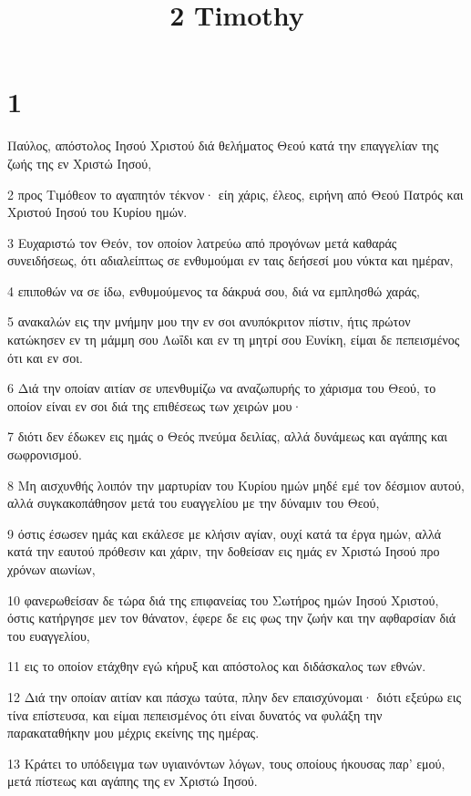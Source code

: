 

\title{2 Timothy}


\chapter{1}

\par Παύλος, απόστολος Ιησού Χριστού διά θελήματος Θεού κατά την επαγγελίαν της ζωής της εν Χριστώ Ιησού,
\par 2 προς Τιμόθεον το αγαπητόν τέκνον· είη χάρις, έλεος, ειρήνη από Θεού Πατρός και Χριστού Ιησού του Κυρίου ημών.
\par 3 Ευχαριστώ τον Θεόν, τον οποίον λατρεύω από προγόνων μετά καθαράς συνειδήσεως, ότι αδιαλείπτως σε ενθυμούμαι εν ταις δεήσεσί μου νύκτα και ημέραν,
\par 4 επιποθών να σε ίδω, ενθυμούμενος τα δάκρυά σου, διά να εμπλησθώ χαράς,
\par 5 ανακαλών εις την μνήμην μου την εν σοι ανυπόκριτον πίστιν, ήτις πρώτον κατώκησεν εν τη μάμμη σου Λωΐδι και εν τη μητρί σου Ευνίκη, είμαι δε πεπεισμένος ότι και εν σοι.
\par 6 Διά την οποίαν αιτίαν σε υπενθυμίζω να αναζωπυρής το χάρισμα του Θεού, το οποίον είναι εν σοι διά της επιθέσεως των χειρών μου·
\par 7 διότι δεν έδωκεν εις ημάς ο Θεός πνεύμα δειλίας, αλλά δυνάμεως και αγάπης και σωφρονισμού.
\par 8 Μη αισχυνθής λοιπόν την μαρτυρίαν του Κυρίου ημών μηδέ εμέ τον δέσμιον αυτού, αλλά συγκακοπάθησον μετά του ευαγγελίου με την δύναμιν του Θεού,
\par 9 όστις έσωσεν ημάς και εκάλεσε με κλήσιν αγίαν, ουχί κατά τα έργα ημών, αλλά κατά την εαυτού πρόθεσιν και χάριν, την δοθείσαν εις ημάς εν Χριστώ Ιησού προ χρόνων αιωνίων,
\par 10 φανερωθείσαν δε τώρα διά της επιφανείας του Σωτήρος ημών Ιησού Χριστού, όστις κατήργησε μεν τον θάνατον, έφερε δε εις φως την ζωήν και την αφθαρσίαν διά του ευαγγελίου,
\par 11 εις το οποίον ετάχθην εγώ κήρυξ και απόστολος και διδάσκαλος των εθνών.
\par 12 Διά την οποίαν αιτίαν και πάσχω ταύτα, πλην δεν επαισχύνομαι· διότι εξεύρω εις τίνα επίστευσα, και είμαι πεπεισμένος ότι είναι δυνατός να φυλάξη την παρακαταθήκην μου μέχρις εκείνης της ημέρας.
\par 13 Κράτει το υπόδειγμα των υγιαινόντων λόγων, τους οποίους ήκουσας παρ' εμού, μετά πίστεως και αγάπης της εν Χριστώ Ιησού.
